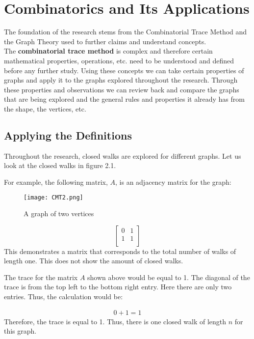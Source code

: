 \chapter{Combinatorics and Its Applications}
The foundation of the research stems from the Combinatorial Trace Method and the Graph Theory used to further claims and understand concepts.\\

The \textbf{combinatorial trace method} is complex and therefore certain mathematical properties, operations, etc. need to be understood and defined before any further study.
\cite{CombinatorialArticle}
Using these concepts we can take certain properties of graphs and apply it to the graphs explored throughout the research.  Through these properties and observations we can review back and compare the graphs that are being explored and the general rules and properties it already has from the shape, the vertices, etc. 

\section{Applying the Definitions}
Throughout the research, closed walks are explored for different graphs.  Let us look at the closed walks in figure 2.1.

For example, the following matrix, $A$, is an adjacency matrix for the graph:\\
\begin{figure}[h]
         \centering
         \texttt{[image: CMT2.png]}
         \caption{\small{A graph of two vertices}}
 \end{figure}

  $$
\begin{bmatrix} 
     0        &         1     \\
     1        &         1      \\

\end{bmatrix}
$$
This demonstrates a matrix that corresponds to the total number of walks of length one. This does not show the amount of closed walks. 

The trace for the matrix $A$ shown above would be equal to 1. The diagonal of the trace is from the top left to the bottom right entry. Here there are only two entries.  Thus, the calculation would be:

\begin{align*}
    0+1=1
\end{align*}
Therefore, the trace is equal to 1. Thus, there is one closed walk of length $n$ for this graph.

